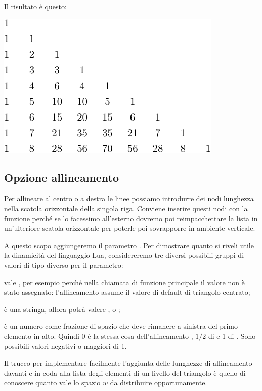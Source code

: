 Il risultato è questo:
\begin{center}
\includegraphics{image/tart-left}
\end{center}


\subsection{Opzione allineamento}

Per allineare al centro o a destra le linee possiamo introdurre dei nodi
lunghezza nella scatola orizzontale della singola riga. Conviene inserire questi
nodi con la funzione  perché se lo facessimo all'esterno dovremo
poi reimpacchettare la lista in un'ulteriore scatola orizzontale per poterle poi
sovrapporre in ambiente verticale.

A questo scopo aggiungeremo il parametro . Per dimostrare quanto si
riveli utile la dinamicità del linguaggio Lua, considereremo tre diversi
possibili gruppi di valori di tipo diverso per il parametro:
\begin{compactitemize}
\item {} vale , per esempio perché nella chiamata di funzione
principale il valore non è stato assegnato: l'allineamento assume il valore di
default di triangolo centrato;
\item {} è una stringa, allora potrà valere ,
 o ;
\item {} è un numero come frazione di spazio che deve rimanere a
sinistra del primo elemento in alto. Quindi 0 è la stessa cosa dell'allineamento
, \( 1/2 \) di  e 1 di . Sono
possibili valori negativi o maggiori di 1.
\end{compactitemize}

Il trucco per implementare facilmente l'aggiunta delle lunghezze di allineamento
davanti e in coda alla lista degli elementi di un livello del triangolo è quello
di conoscere quanto vale lo spazio \( w \) da distribuire opportunamente.

